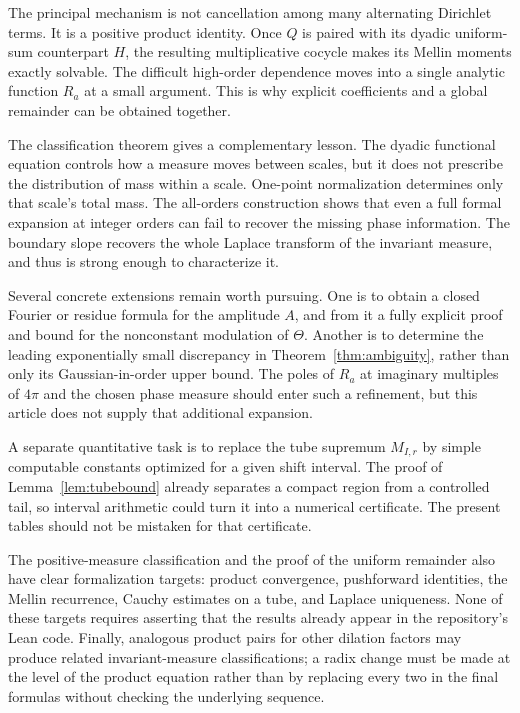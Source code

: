 \documentclass[11pt,letterpaper]{article}
\numberwithin{equation}{section}
\theoremstyle{definition}
\theoremstyle{remark}
\begin{document}
The principal mechanism is not cancellation among many alternating
Dirichlet terms. It is a positive product identity. Once $Q$ is paired
with its dyadic uniform-sum counterpart $H$, the resulting multiplicative
cocycle makes its Mellin moments exactly solvable. The difficult
high-order dependence moves into a single analytic function $R_a$ at a
small argument. This is why explicit coefficients and a global remainder
can be obtained together.

The classification theorem gives a complementary lesson. The dyadic
functional equation controls how a measure moves between scales, but it
does not prescribe the distribution of mass within a scale. One-point
normalization determines only that scale's total mass. The all-orders
construction shows that even a full formal expansion at integer orders
can fail to recover the missing phase information. The boundary slope
recovers the whole Laplace transform of the invariant measure, and thus
is strong enough to characterize it.

Several concrete extensions remain worth pursuing. One is to obtain a
closed Fourier or residue formula for the amplitude $A$, and from it a
fully explicit proof and bound for the nonconstant modulation of $\Theta$.
Another is to determine the leading exponentially small discrepancy in
Theorem~\ref{thm:ambiguity}, rather than only its Gaussian-in-order upper
bound. The poles of $R_a$ at imaginary multiples of $4\pi$ and the chosen
phase measure should enter such a refinement, but this article does not
supply that additional expansion.

A separate quantitative task is to replace the tube supremum $M_{I,r}$ by
simple computable constants optimized for a given shift interval.
The proof of Lemma~\ref{lem:tubebound} already separates a compact region
from a controlled tail, so interval arithmetic could turn it into a
numerical certificate. The present tables should not be mistaken for that
certificate.

The positive-measure classification and the proof of the uniform remainder
also have clear formalization targets: product convergence, pushforward
identities, the Mellin recurrence, Cauchy estimates on a tube, and Laplace
uniqueness. None of these targets requires asserting that the results
already appear in the repository's Lean code. Finally, analogous product
pairs for other dilation factors may produce related invariant-measure
classifications; a radix change must be made at the level of the product
equation rather than by replacing every two in the final formulas without
checking the underlying sequence.
\end{document}
